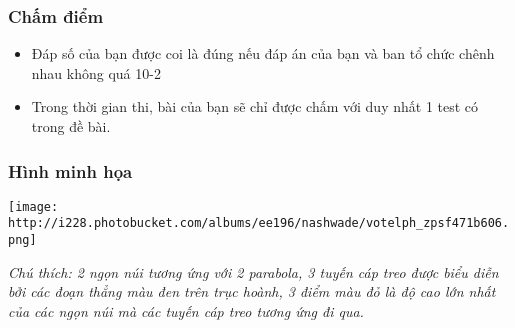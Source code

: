 \subsubsection{   Chấm điểm  }
\begin{itemize}
	\item     Đáp số của bạn được coi là đúng nếu đáp án của bạn và ban tổ chức chênh nhau không quá 10-2   
	\item     Trong thời gian thi, bài của bạn sẽ chỉ được chấm với duy nhất 1 test có trong đề bài.   
\end{itemize}

\subsubsection{   Hình minh họa  }




\texttt{[image: http://i228.photobucket.com/albums/ee196/nashwade/votelph\_zpsf471b606.png]}

\emph{    Chú thích: 2 ngọn núi tương ứng với 2 parabola, 3 tuyến cáp treo được biểu diễn bởi các đoạn thẳng màu đen trên trục hoành, 3 điểm màu đỏ là độ cao lớn nhất của các ngọn núi mà các tuyến cáp treo tương ứng đi qua.   }
